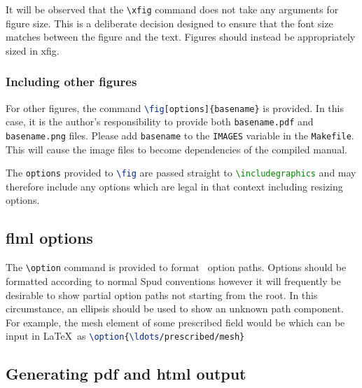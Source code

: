 It will be observed that the \verb+\xfig+ command does not take any arguments
for figure size. This is a deliberate decision designed to ensure that the
font size matches between the figure and the text. Figures should instead be
appropriately sized in xfig.

\subsubsection{Including other figures}

For other figures, the command
\lstinline[language=TeX]+\fig[options]{basename}+ is provided. In this case,
it is the author's responsibility to provide both \verb+basename.pdf+ and
\verb+basename.png+ files. Please add \verb+basename+ to the \verb+IMAGES+
variable in the \verb+Makefile+. This will cause the image files to become
dependencies of the compiled manual.

The \lstinline[language=TeX]+options+ provided to
\lstinline[language=TeX]+\fig+ are passed straight to
\lstinline[language=TeX]+\includegraphics+ and may therefore include any
options which are legal in that context including resizing options.

\subsection{flml options}

The \verb+\option+ command is provided to format \fluidity\ option
paths. Options should be formatted according to normal Spud conventions
however it will frequently be desirable to show partial option paths not
starting from the root. In this circumstance, an ellipsis should be used to
show an unknown path component. For example, the mesh element of some
prescribed field would be  which can be input
in \LaTeX\ as \lstinline[language=TeX]+\option{\ldots/prescribed/mesh}+

\subsection{Generating pdf and html output}

